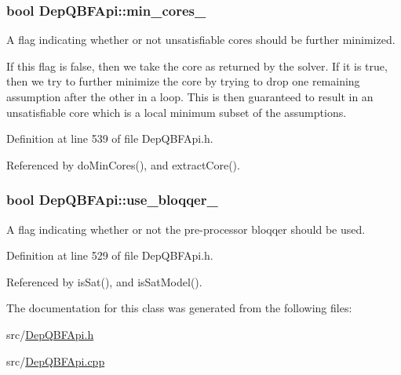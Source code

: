 \hypertarget{classDepQBFApi_aeba411424d6185767325936d2ccf11de}{
\subsubsection[{min\-\_\-cores\-\_\-}]{\setlength{\rightskip}{0pt plus 5cm}bool Dep\-Q\-B\-F\-Api\-::min\-\_\-cores\-\_\-\hspace{0.3cm}{\ttfamily [protected]}}}\label{classDepQBFApi_aeba411424d6185767325936d2ccf11de}


A flag indicating whether or not unsatisfiable cores should be further minimized. 

If this flag is false, then we take the core as returned by the solver. If it is true, then we try to further minimize the core by trying to drop one remaining assumption after the other in a loop. This is then guaranteed to result in an unsatisfiable core which is a local minimum subset of the assumptions. 

Definition at line 539 of file Dep\-Q\-B\-F\-Api.\-h.



Referenced by do\-Min\-Cores(), and extract\-Core().

\hypertarget{classDepQBFApi_a04798225c77a19a1d2f415e50b93cfb1}{
\subsubsection[{use\-\_\-bloqqer\-\_\-}]{\setlength{\rightskip}{0pt plus 5cm}bool Dep\-Q\-B\-F\-Api\-::use\-\_\-bloqqer\-\_\-\hspace{0.3cm}{\ttfamily [protected]}}}\label{classDepQBFApi_a04798225c77a19a1d2f415e50b93cfb1}


A flag indicating whether or not the pre-\/processor bloqqer should be used. 



Definition at line 529 of file Dep\-Q\-B\-F\-Api.\-h.



Referenced by is\-Sat(), and is\-Sat\-Model().



The documentation for this class was generated from the following files\-:\begin{DoxyCompactItemize}
\item 
src/\hyperlink{DepQBFApi_8h}{Dep\-Q\-B\-F\-Api.\-h}\item 
src/\hyperlink{DepQBFApi_8cpp}{Dep\-Q\-B\-F\-Api.\-cpp}\end{DoxyCompactItemize}

